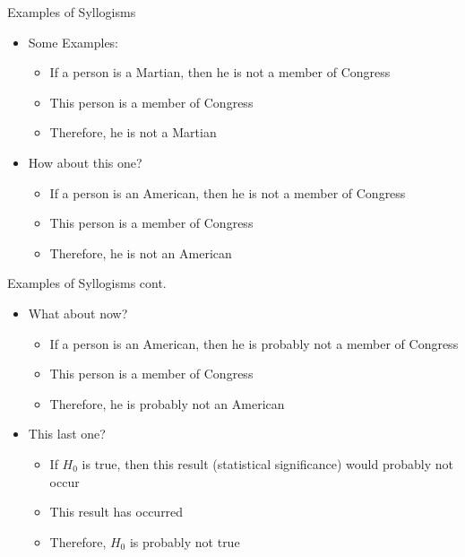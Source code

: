 \documentclass[aspectratio=169, 12pt]{beamer}
\begin{document}
\begin{frame}{Examples of Syllogisms}
  \begin{itemize}
  \item Some Examples:
    \begin{itemize}
    \item If a person is a Martian, then he is not a member of Congress
    \item This person is a member of Congress
    \item Therefore, he is not a Martian
    \end{itemize}
  \item How about this one?
    \begin{itemize}
    \item If a person is an American, then he is not a member of Congress  %
    \item This person is a member of Congress
    \item Therefore, he is not an American
    \end{itemize}
  \end{itemize}
\end{frame}

\begin{frame}{Examples of Syllogisms cont.}
  \begin{itemize}
  \item What about now?
    \begin{itemize}
    \item If a person is an American, then he is probably not a member of Congress %
    \item This person is a member of Congress
    \item Therefore, he is probably not an American
    \end{itemize}
  \item This last one?
    \begin{itemize}
    \item If $H_0$ is true, then this result (statistical significance) would probably not occur %
    \item This result has occurred
    \item Therefore, $H_0$ is probably not true
    \end{itemize}
  \end{itemize}
\end{frame}
\end{document}
